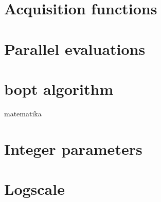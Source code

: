 \section{Acquisition functions}
\label{section:acq-fn}

\section{Parallel evaluations}

\section{bopt algorithm}

matematika

\section{Integer parameters}

\section{Logscale}

